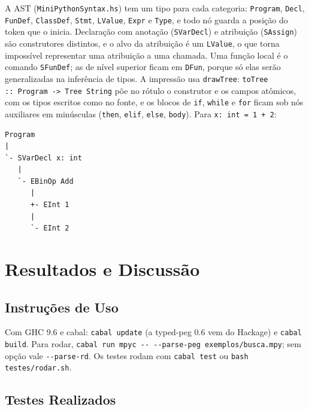 \documentclass[12pt,a4paper]{article}
\begin{document}
A AST (\texttt{MiniPythonSyntax.hs}) tem um tipo para cada categoria:
\texttt{Program}, \texttt{Decl}, \texttt{FunDef}, \texttt{ClassDef},
\texttt{Stmt}, \texttt{LValue}, \texttt{Expr} e \texttt{Type}, e todo nó
guarda a posição do token que o inicia. Declaração com anotação
(\texttt{SVarDecl}) e atribuição (\texttt{SAssign}) são construtores
distintos, e o alvo da atribuição é um \texttt{LValue}, o que torna
impossível representar uma atribuição a uma chamada. Uma função local é
o comando \texttt{SFunDef}; as de nível superior ficam em
\texttt{DFun}, porque só elas serão generalizadas na inferência de
tipos. A impressão usa
\texttt{drawTree}: \texttt{toTree ::\ Program -> Tree String} põe no
rótulo o construtor e os campos atômicos, com os tipos escritos como no
fonte, e os blocos de \texttt{if}, \texttt{while} e \texttt{for} ficam
sob nós auxiliares em minúsculas (\texttt{then}, \texttt{elif},
\texttt{else}, \texttt{body}). Para \texttt{x: int = 1 + 2}:

\begin{lstlisting}[style=gram]
Program
|
`- SVarDecl x: int
   |
   `- EBinOp Add
      |
      +- EInt 1
      |
      `- EInt 2
\end{lstlisting}


\section{Resultados e Discussão}

\subsection{Instruções de Uso}

Com GHC 9.6 e cabal: \texttt{cabal update} (a typed-peg 0.6 vem do
Hackage) e \texttt{cabal build}. Para rodar,
\texttt{cabal run mpyc -{}- -{}-parse-peg exemplos/busca.mpy}; sem
opção vale \texttt{-{}-parse-rd}. Os testes rodam com
\texttt{cabal test} ou \texttt{bash testes/rodar.sh}.

\subsection{Testes Realizados}
\label{sec:testes}
\end{document}
